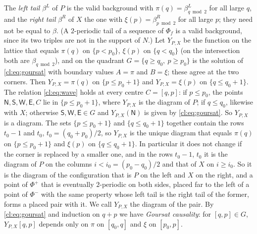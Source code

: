 The \emph{left tail} $\beta^L$ of $P$ is the valid background with $\pi(q)=\beta^L_{q\bmod2}$ for all large $q$, and the \emph{right tail} $\beta^R$ of $X$ the one with $\xi(p)=\beta^R_{p\bmod2}$ for all large $p$; they need not be equal to $\beta$. (A $2$-periodic tail of a sequence of $\Phi_f$ is a valid background, since its two triples are not in the support of $N$.) Let $Y_{P,X}$ be the function on the lattice that equals $\pi(q)$ on $\{p<p_0\}$, $\xi(p)$ on $\{q<q_0\}$ (on the intersection both are $\beta_{q\bmod2}$), and on the quadrant $G=\{q\ge q_0,\ p\ge p_0\}$ is the solution of \eqref{cl:eq:goursat} with boundary values $A=\pi$ and $B=\xi$; these agree at the two corners. Then $Y_{P,X}=\pi(q)$ on $\{p\le p_0+1\}$ and $Y_{P,X}=\xi(p)$ on $\{q\le q_0+1\}$. The relation \eqref{cl:eq:wave} holds at every centre $C=[q,p]$: if $p\le p_0$, the points $\mathsf N,\mathsf S,\mathsf W,\mathsf E,C$ lie in $\{p\le p_0+1\}$, where $Y_{P,X}$ is the diagram of $P$; if $q\le q_0$, likewise with $X$; otherwise $\mathsf S,\mathsf W,\mathsf E\in G$ and $Y_{P,X}(\mathsf N)$ is given by \eqref{cl:eq:goursat}. So $Y_{P,X}$ is a diagram. The sets $\{p\le p_0+1\}$ and $\{q\le q_0+1\}$ together contain the rows $t_0-1$ and $t_0$, $t_0=(q_0+p_0)/2$, so $Y_{P,X}$ is the unique diagram that equals $\pi(q)$ on $\{p\le p_0+1\}$ and $\xi(p)$ on $\{q\le q_0+1\}$. In particular it does not change if the corner is replaced by a smaller one, and in the rows $t_0-1$, $t_0$ it is the diagram of $P$ on the columns $i<i_0=(p_0-q_0)/2$ and that of $X$ on $i\ge i_0$. So it is the diagram of the configuration that is $P$ on the left and $X$ on the right, and a point of $\Phi^+$ that is eventually $2$-periodic on both sides, placed far to the left of a point of $\Phi^-$ with the same property whose left tail is the right tail of the former, forms a placed pair with it. We call $Y_{P,X}$ the diagram of the pair. By \eqref{cl:eq:goursat} and induction on $q+p$ we have \emph{Goursat causality}: for $[q,p]\in G$, $Y_{P,X}[q,p]$ depends only on $\pi$ on $[q_0,q]$ and $\xi$ on $[p_0,p]$.

